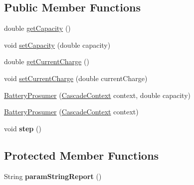 \subsection*{Public Member Functions}
\begin{DoxyCompactItemize}
\item 
double \hyperlink{classuk_1_1ac_1_1dmu_1_1iesd_1_1cascade_1_1agents_1_1prosumers_1_1_battery_prosumer_aaf1b156fb5375079fbf561cd0a613699}{get\-Capacity} ()
\item 
void \hyperlink{classuk_1_1ac_1_1dmu_1_1iesd_1_1cascade_1_1agents_1_1prosumers_1_1_battery_prosumer_a92db7f8aa92838f856c92ecad00e4391}{set\-Capacity} (double capacity)
\item 
double \hyperlink{classuk_1_1ac_1_1dmu_1_1iesd_1_1cascade_1_1agents_1_1prosumers_1_1_battery_prosumer_ad4098189424cfe50be828810453a1d8f}{get\-Current\-Charge} ()
\item 
void \hyperlink{classuk_1_1ac_1_1dmu_1_1iesd_1_1cascade_1_1agents_1_1prosumers_1_1_battery_prosumer_a82f43990f7ad6a71a4d582c38b2da47a}{set\-Current\-Charge} (double current\-Charge)
\item 
\hyperlink{classuk_1_1ac_1_1dmu_1_1iesd_1_1cascade_1_1agents_1_1prosumers_1_1_battery_prosumer_a0fa8279b139e05af810a4a6b6a0358aa}{Battery\-Prosumer} (\hyperlink{classuk_1_1ac_1_1dmu_1_1iesd_1_1cascade_1_1context_1_1_cascade_context}{Cascade\-Context} context, double capacity)
\item 
\hyperlink{classuk_1_1ac_1_1dmu_1_1iesd_1_1cascade_1_1agents_1_1prosumers_1_1_battery_prosumer_a1d892e3edab2b989b00373047bc8dd19}{Battery\-Prosumer} (\hyperlink{classuk_1_1ac_1_1dmu_1_1iesd_1_1cascade_1_1context_1_1_cascade_context}{Cascade\-Context} context)
\item 
\hypertarget{classuk_1_1ac_1_1dmu_1_1iesd_1_1cascade_1_1agents_1_1prosumers_1_1_battery_prosumer_a816dd74c5953345050ab44574daaa759}{void {\bfseries step} ()}\label{classuk_1_1ac_1_1dmu_1_1iesd_1_1cascade_1_1agents_1_1prosumers_1_1_battery_prosumer_a816dd74c5953345050ab44574daaa759}

\end{DoxyCompactItemize}
\subsection*{Protected Member Functions}
\begin{DoxyCompactItemize}
\item 
\hypertarget{classuk_1_1ac_1_1dmu_1_1iesd_1_1cascade_1_1agents_1_1prosumers_1_1_battery_prosumer_a0455bef1451be6758f82cdee7165c6df}{String {\bfseries param\-String\-Report} ()}\label{classuk_1_1ac_1_1dmu_1_1iesd_1_1cascade_1_1agents_1_1prosumers_1_1_battery_prosumer_a0455bef1451be6758f82cdee7165c6df}

\end{DoxyCompactItemize}
